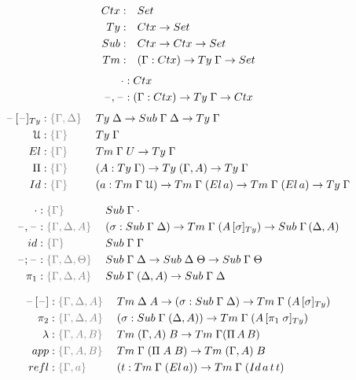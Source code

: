 \documentclass[a4paper,UKenglish,numberwithinsect,cleveref,thm-restate]{lipics-v2021}
\begin{document}
\begin{alignat*}{3}
  \Ctx      & : && \Set                   \\
  \Ty       & : && \Ctx \to \Set          \\
  \Sub      & : && \Ctx \to \Ctx \to \Set \\
  \Tm       & : && (\Gamma : \Ctx) \to \Ty\;\Gamma \to \Set
\end{alignat*}
\begin{alignat*}{5}
  \emptyctx     & : \Ctx \\
  \blank,\blank & : (\Gamma : \Ctx) \to \Ty\;\Gamma \to \Ctx
\end{alignat*}
\begin{alignat*}{5}
\subTy{\blank}{\blank} & : \implicit{\Gamma, \Delta}\; && \Ty\;\Delta \to \Sub\;\Gamma\;\Delta \to \Ty\;\Gamma \\
  \UU         & : \implicit{\Gamma}\; && \Ty\; \Gamma \\
  \El         & : \implicit{\Gamma}\; && \Tm\;\Gamma\;U \to \Ty\;\Gamma \\
  \Pi         & : \implicit{\Gamma}\; && (A : \Ty\;\Gamma) \to \Ty\;(\Gamma, A) \to \Ty\;\Gamma \\
  \mathsf{Id} & : \implicit{\Gamma}\; && (a : \Tm\;\Gamma\;\UU) \to \Tm\;\Gamma\;(\El\,a) \to \Tm\;\Gamma\;(\El\,a) \to \Ty\;\Gamma
\end{alignat*}

\begin{alignat*}{5}
  \emptysub & : \implicit{\Gamma} && \Sub\;\Gamma\;\emptyctx \\
  \blank,\blank & : \implicit{\Gamma, \Delta, A} && (\sigma : \Sub\;\Gamma\;\Delta) \to \Tm\;\Gamma\;(\subTy{A}{\sigma}) \to \Sub\;\Gamma\,(\Delta, A) \\
  \idS & : \implicit{\Gamma} && \Sub\;\Gamma\;\Gamma \\
  \blank;\blank & : \implicit{\Gamma, \Delta, \Theta} && \Sub\;\Gamma\;\Delta \to \Sub\;\Delta\;\Theta \to \Sub\;\Gamma\;\Theta \\
  \pi_1 & : \implicit{\Gamma, \Delta, A}\; && \Sub\;\Gamma\;(\Delta, A) \to \Sub\;\Gamma\;\Delta
\end{alignat*}


\begin{alignat*}{5}
  \sub{\blank}{\blank} & : \implicit{\Gamma,\Delta, A} && \Tm\;\Delta\;A \to (\sigma : \Sub\;\Gamma\;\Delta) \to \Tm\;\Gamma\;(\subTy{A}{\sigma}) \\
  \pi_2 & : \implicit{\Gamma, \Delta, A}\; && (\sigma : \Sub\;\Gamma\;(\Delta, A)) \to \Tm\;\Gamma\;(\subTy{A}{\pi_1\;\sigma}) \\
  \lambda         &: \implicit{\Gamma, A, B} \; && \Tm\;(\Gamma, A)\;B \to \Tm\;\Gamma(\Pi\,A\,B) \\
  \mathsf{app}    &: \implicit{\Gamma, A, B} \; && \Tm\;\Gamma\;(\Pi\;A\;B) \to \Tm\;(\Gamma, A)\;B \\
  \mathsf{refl} & : \implicit{\Gamma, a}\;&&(t : \Tm\;\Gamma\;(\El\,a)) \to \Tm\;\Gamma\;(\mathsf{Id}\,a\,t\,t)
\end{alignat*}
\end{document}
